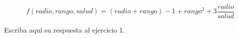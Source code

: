 $$ f(radio,rango,salud)=(radio+rango)-1+rango^2+3\frac{radio}{salud} $$

Escriba aquí su respuesta al ejercicio 1.